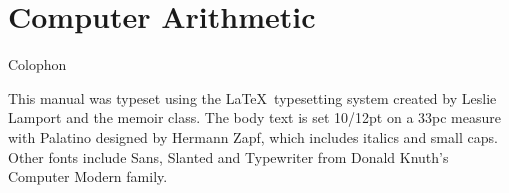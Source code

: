 \documentclass[letterpaper,10pt,extrafontsizesmtwoside,onecolumn,openright,draft,fleqn]{memoir}
\begin{document}








\part{Computer Arithmetic}



\begin{comment}




\part{Inductive Data Structures}











\part{Computation in Practice}







\end{comment}

\backmatter

\cleardoublepage
\pagestyle{empty}
\null\vfil

\begin{adjustwidth}{1in}{1in}
\begin{center}
{\Large\textsf{Colophon}}
\end{center}
\begin{center}
This manual was typeset using the \LaTeX\ typesetting system
created by Leslie Lamport and the memoir class.
The body text is set 10/12pt on a
33pc measure with Palatino designed by Hermann Zapf, which includes
italics and small caps. Other fonts include
Sans, Slanted and Typewriter from Donald Knuth's
Computer Modern family.

\end{center}

\end{adjustwidth}

\vfil
\end{document}
